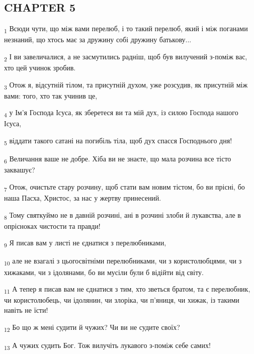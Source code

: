 \subsection{CHAPTER 5}
\begin{tcolorbox}
\textsubscript{1} Всюди чути, що між вами перелюб, і то такий перелюб, який і між поганами незнаний, що хтось має за дружину собі дружину батькову...
\end{tcolorbox}
\begin{tcolorbox}
\textsubscript{2} І ви завеличалися, а не засмутились радніш, щоб був вилучений з-поміж вас, хто цей учинок зробив.
\end{tcolorbox}
\begin{tcolorbox}
\textsubscript{3} Отож я, відсутній тілом, та присутній духом, уже розсудив, як присутній між вами: того, хто так учинив це,
\end{tcolorbox}
\begin{tcolorbox}
\textsubscript{4} у Ім'я Господа Ісуса, як зберетеся ви та мій дух, із силою Господа нашого Ісуса,
\end{tcolorbox}
\begin{tcolorbox}
\textsubscript{5} віддати такого сатані на погибіль тіла, щоб дух спасся Господнього дня!
\end{tcolorbox}
\begin{tcolorbox}
\textsubscript{6} Величання ваше не добре. Хіба ви не знаєте, що мала розчина все тісто заквашує?
\end{tcolorbox}
\begin{tcolorbox}
\textsubscript{7} Отож, очистьте стару розчину, щоб стати вам новим тістом, бо ви прісні, бо наша Пасха, Христос, за нас у жертву принесений.
\end{tcolorbox}
\begin{tcolorbox}
\textsubscript{8} Тому святкуймо не в давній розчині, ані в розчині злоби й лукавства, але в опрісноках чистости та правди!
\end{tcolorbox}
\begin{tcolorbox}
\textsubscript{9} Я писав вам у листі не єднатися з перелюбниками,
\end{tcolorbox}
\begin{tcolorbox}
\textsubscript{10} але не взагалі з цьогосвітніми перелюбниками, чи з користолюбцями, чи з хижаками, чи з ідолянами, бо ви мусіли були б відійти від світу.
\end{tcolorbox}
\begin{tcolorbox}
\textsubscript{11} А тепер я писав вам не єднатися з тим, хто зветься братом, та є перелюбник, чи користолюбець, чи ідолянин, чи злоріка, чи п'яниця, чи хижак, із такими навіть не їсти!
\end{tcolorbox}
\begin{tcolorbox}
\textsubscript{12} Бо що ж мені судити й чужих? Чи ви не судите своїх?
\end{tcolorbox}
\begin{tcolorbox}
\textsubscript{13} А чужих судить Бог. Тож вилучіть лукавого з-поміж себе самих!
\end{tcolorbox}
